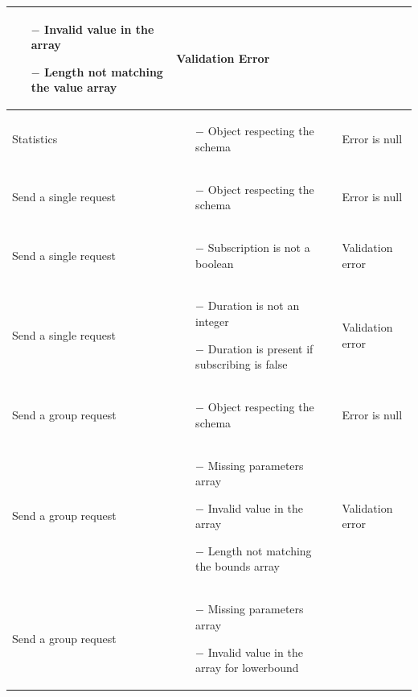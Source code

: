 \documentclass[titlepage]{article}
\begin{document}
\begin{longtable}{| p{3 cm} | p{5 cm} | p{3 cm} |}
\begin{itemize}[nolistsep]
			\item[$-$] Invalid value in the array
			\item[$-$] Length not matching the value array
		\end{itemize}
		& Validation Error \\ \hline
		Statistics & \begin{itemize}[nolistsep]
			\item[$-$] Object respecting the schema
		\end{itemize}
		& Error is null \\ \hline
		Send a single request & \begin{itemize}[nolistsep]
			\item[$-$] Object respecting the schema
		\end{itemize}
		& Error is null \\ \hline
		Send a single request & \begin{itemize}[nolistsep]
			\item[$-$] Subscription is not a boolean
		\end{itemize}
		& Validation error \\ \hline
		Send a single request & \begin{itemize}[nolistsep]
			\item[$-$] Duration is not an integer
			\item[$-$] Duration is present if subscribing is false
		\end{itemize}
		& Validation error \\ \hline
		Send a group request & \begin{itemize}[nolistsep]
			\item[$-$] Object respecting the schema
		\end{itemize}
		& Error is null \\ \hline
		Send a group request & \begin{itemize}[nolistsep]
			\item[$-$] Missing parameters array
			\item[$-$] Invalid value in the array
			\item[$-$] Length not matching the bounds array
		\end{itemize}
		& Validation error \\ \hline
		Send a group request & \begin{itemize}[nolistsep]
			\item[$-$] Missing parameters array
			\item[$-$] Invalid value in the array for lowerbound

\end{itemize}
\end{longtable}
\end{document}
